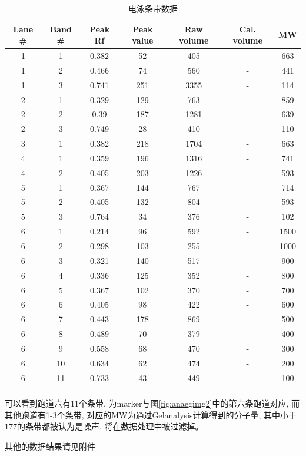 \documentclass[AutoFakeBold]{LZUThesis}
\begin{document}
\begin{longtable}{ccccccc}
    \hline
    Lane \# & Band \# & Peak Rf & Peak value & Raw volume & Cal. volume & MW \\
    \hline
    \endhead
    1 & 1 & 0.382 & 52 & 405 & - & 663 \\
    1 & 2 & 0.466 & 74 & 560 & - & 441 \\
    1 & 3 & 0.741 & 251 & 3355 & - & 114 \\
    2 & 1 & 0.329 & 129 & 763 & - & 859 \\
    2 & 2 & 0.39 & 187 & 1281 & - & 639 \\
    2 & 3 & 0.749 & 28 & 410 & - & 110 \\
    3 & 1 & 0.382 & 218 & 1704 & - & 663 \\
    4 & 1 & 0.359 & 196 & 1316 & - & 741 \\
    4 & 2 & 0.405 & 203 & 1226 & - & 593 \\
    5 & 1 & 0.367 & 144 & 767 & - & 714 \\
    5 & 2 & 0.405 & 132 & 804 & - & 593 \\
    5 & 3 & 0.764 & 34 & 376 & - & 102 \\
    6 & 1 & 0.214 & 96 & 592 & - & 1500 \\
    6 & 2 & 0.298 & 103 & 255 & - & 1000 \\
    6 & 3 & 0.321 & 140 & 517 & - & 900 \\
    6 & 4 & 0.336 & 125 & 352 & - & 800 \\
    6 & 5 & 0.367 & 102 & 370 & - & 700 \\
    6 & 6 & 0.405 & 98 & 422 & - & 600 \\
    6 & 7 & 0.443 & 178 & 869 & - & 500 \\
    6 & 8 & 0.489 & 70 & 379 & - & 400 \\
    6 & 9 & 0.558 & 68 & 470 & - & 300 \\
    6 & 10 & 0.634 & 62 & 474 & - & 200 \\
    6 & 11 & 0.733 & 43 & 449 & - & 100 \\
    \hline
    \caption{电泳条带数据}
    \label{tab:anadataeg} \\
\end{longtable}

可以看到跑道六有11个条带, 为marker与图\ref{fig:anaegimg2}中的第六条跑道对应, 而其他跑道有1-3个条带, 对应的MW为通过Gelanalysis计算得到的分子量, 其中小于177的条带都被认为是噪声, 将在数据处理中被过滤掉。

其他的数据结果请见附件
\end{document}
